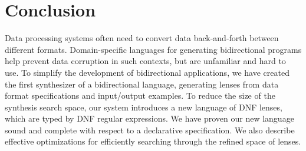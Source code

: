 \documentclass[sigplan,acmsmall]{acmart}
\begin{document}





\section{Conclusion}
\label{sec:conc}

Data processing systems often need to convert data back-and-forth
between different formats.  Domain-specific languages for generating
bidirectional programs help prevent data corruption in such contexts,
but are unfamiliar and hard to use.  To simplify the development of
bidirectional applications, we have created the first synthesizer of a
bidirectional language, generating
lenses from data format specifications and input/output examples.
To reduce the size of the synthesis search space, our system introduces
a new language of DNF lenses, which are typed by DNF regular expressions.
We have proven our new language sound and complete with respect to
a declarative specification.  We also describe effective optimizations
for efficiently searching through the refined space of lenses.
\end{document}
